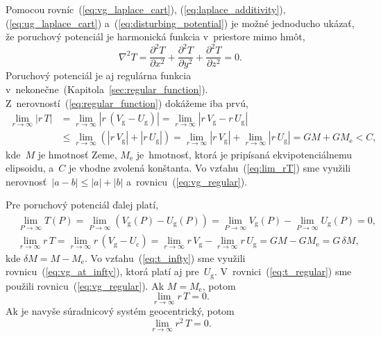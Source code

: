 \documentclass[a4paper, 12pt]{book}
\newcommand{\gidx}{\mathrm g}
\newcommand{\cidx}{\mathrm c}
\begin{document}
Pomocou rovníc~(\ref{eq:vg_laplace_cart}), (\ref{eq:laplace_additivity}), 
(\ref{eq:ug_laplace_cart}) a~(\ref{eq:disturbing_potential}) je možné 
jednoducho ukázať, že poruchový potenciál je harmonická funkcia v~priestore 
mimo hmôt,
%
\begin{equation}
\label{eq:laplace_xyz_t}
\nabla^2 T = \frac{\partial^2 T}{\partial x^2} + \frac{\partial^2 T}{\partial 
y^2} + \frac{\partial^2 T}{\partial z^2} = 0{.}
\end{equation}
%
Poruchový potenciál je aj regulárna funkcia 
v~nekonečne~(Kapitola~\ref{sec:regular_function}).  
Z~nerovností~(\ref{eq:regular_function}) dokážeme iba prvú,
%
\begin{equation}
\label{eq:lim_rT}
\begin{split}
\lim_{r \rightarrow \infty} \left| r \, T \right| &= \lim_{r \rightarrow 
\infty} \left| r \,  \left( V_\gidx - U_\gidx \right) \right| = \lim_{r 
\rightarrow \infty} \left| r \, V_\gidx - r \, U_\gidx \right|\\
%
&\leq \lim_{r \rightarrow \infty} \left( \left| r \, V_\gidx \right| + \left| 
r \, U_\gidx \right| \right) = \lim_{r \rightarrow \infty} \left| r \, V_\gidx 
\right| + \lim_{r \rightarrow \infty} \left| r \, U_\gidx \right| = GM 
+ GM_\mathrm{e} < C{,}
\end{split}
\end{equation}
%
kde~$M$ je hmotnosť Zeme, $M_\mathrm{e}$ je~hmotnosť, ktorá je pripísaná 
ekvipotenciálnemu elipsoidu, a~$C$ je vhodne zvolená konštanta.  Vo 
vzťahu~(\ref{eq:lim_rT}) sme využili nerovnosť~$| a - b | \leq |a| + |b|$ 
a~rovnicu~(\ref{eq:vg_regular}).

Pre poruchový potenciál ďalej platí,
%
\begin{align}
\label{eq:t_infty}
&\lim_{P \rightarrow \infty} T(P) = \lim_{P \rightarrow \infty} (V_\gidx(P) 
- U_\gidx(P)) = \lim_{P \rightarrow \infty} V_\gidx(P) - \lim_{P \rightarrow 
\infty} U_\gidx(P) = 0{,}\\
%
\label{eq:t_regular}
&\lim_{r \rightarrow \infty} r \, T = \lim_{r \rightarrow \infty} r \, (V_\gidx 
 - U_\cidx) = \lim_{r \rightarrow \infty} r \, V_\gidx - \lim_{r \rightarrow 
 \infty} r \, U_\gidx = GM - GM_{\mathrm{e}} = G \, \delta M{,}
\end{align}
%
kde $\delta M = M - M_\mathrm{e}$.  Vo vzťahu~(\ref{eq:t_infty}) sme využili 
rovnicu~(\ref{eq:vg_at_infty}), ktorá platí aj pre~$U_\gidx$.  
V~rovnici~(\ref{eq:t_regular}) sme použili rovnicu~(\ref{eq:vg_regular}).  Ak 
$M = M_\mathrm{e}$, potom
%
\begin{equation}
\lim_{r \rightarrow \infty} r \, T = 0{.}
\end{equation}
%
Ak je navyše súradnicový systém geocentrický, potom \parencite{Pick1973}
%
\begin{equation}
\lim_{r \rightarrow \infty} r^2 \, T = 0{.}
\end{equation}
\end{document}
